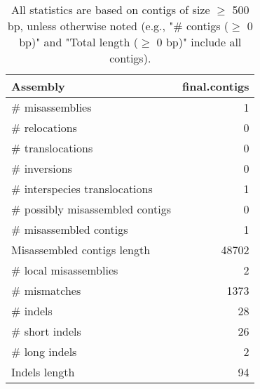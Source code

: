 \documentclass[12pt,a4paper]{article}
\begin{document}
\begin{table}[ht]
\begin{center}
\caption{All statistics are based on contigs of size $\geq$ 500 bp, unless otherwise noted (e.g., "\# contigs ($\geq$ 0 bp)" and "Total length ($\geq$ 0 bp)" include all contigs).}
\begin{tabular}{|l*{1}{|r}|}
\hline
Assembly & final.contigs \\ \hline
\# misassemblies & 1 \\ \hline
\hspace{5mm}\# relocations & 0 \\ \hline
\hspace{5mm}\# translocations & 0 \\ \hline
\hspace{5mm}\# inversions & 0 \\ \hline
\hspace{5mm}\# interspecies translocations & 1 \\ \hline
\# possibly misassembled contigs & 0 \\ \hline
\# misassembled contigs & 1 \\ \hline
Misassembled contigs length & 48702 \\ \hline
\# local misassemblies & 2 \\ \hline
\# mismatches & 1373 \\ \hline
\# indels & 28 \\ \hline
\hspace{5mm}\# short indels & 26 \\ \hline
\hspace{5mm}\# long indels & 2 \\ \hline
Indels length & 94 \\ \hline
\end{tabular}
\end{center}
\end{table}
\end{document}
